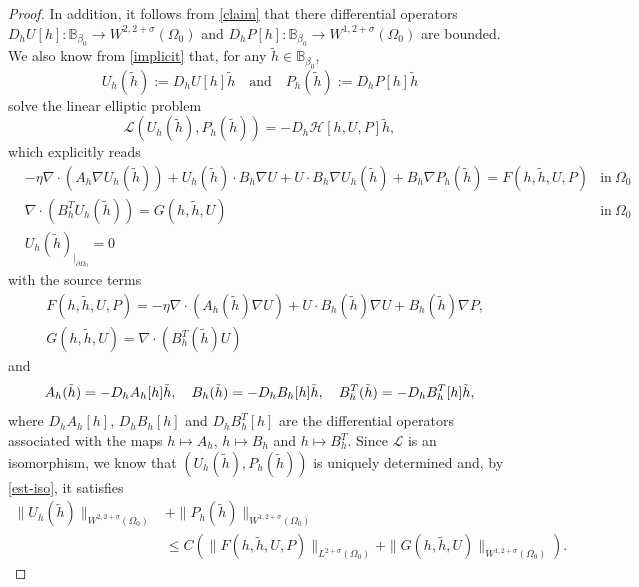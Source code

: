 \documentclass[10pt,a4paper]{amsart}
\begin{document}
\begin{proof}
In addition, it follows from \eqref{claim} that there differential operators $D_h U[h] : \mathbb{B}_{\beta_0}\rightarrow W^{2, 2+\sigma}(\Omega_0)$ and $D_h P[h] : \mathbb{B}_{\beta_0}\rightarrow W^{1,2+\sigma}(\Omega_0)$ are bounded. We also know from \eqref{implicit} that, for any $\tilde h\in \mathbb{B}_{\beta_0}$,  $$U_h(\tilde{h}):=D_h U[h] \tilde{h}\quad \text{and} \quad P_h(\tilde{h}):=D_h P[h] \tilde{h}$$ solve the linear elliptic problem
\begin{equation*}
\mathcal{L}( U_h(\tilde{h}), P_h(\tilde{h}) )= - D_h\mathcal{H}[h, U, P]\tilde{h},
\end{equation*} which explicitly reads
\begin{equation*}
\begin{aligned}
&-\eta\nabla \cdot (A_h\nabla U_h(\tilde{h})) + U_h(\tilde{h}) \cdot B_h\nabla U + U \cdot B_h\nabla U_h(\tilde{h}) + B_h\nabla P_h(\tilde{h})= F(h, \tilde{h}, U, P)
&\mbox{in} \ \Omega_0 \\[5pt]
&\nabla \cdot (B_h^T U_h(\tilde{h})) = G(h, \tilde{h}, U) &\mbox{in} \ \Omega_0\\[5pt]
&U_h(\tilde{h})_{|_{\partial \Omega_0}}=0
\end{aligned}
\end{equation*}
with the source terms
\begin{equation*}\begin{aligned}
    &F(h, \tilde{h}, U, P)=-\eta \nabla \cdot (A_h(\tilde{h})\nabla U) + U\cdot B_h(\tilde{h})\nabla U + B_h(\tilde{h})\nabla P,\\[5pt]&
    G(h, \tilde{h}, U)= \nabla \cdot ( B^T_h(\tilde{h}) U)
    \end{aligned}
\end{equation*}
and
\begin{equation*}
A_h(\tilde{h})=- D_h A_h[h]\tilde{h}, \quad
B_h(\tilde{h})= -D_h B_h[h]\tilde{h},\quad
B_h^T(\tilde{h})= -D_h B_h^T[h]\tilde{h}, \\[5pt]
\end{equation*} where $D_h A_h[h]$, $ D_h B_h[h]$ and $D_h B_h^T[h]$ are the differential operators associated with the maps $h\mapsto A_h$, $h\mapsto B_h$ and $h\mapsto B_h^T$.
Since $\mathcal{L}$ is an isomorphism, we know that $(U_h(\tilde{h}), P_h(\tilde{h}))$ is uniquely determined and, by \eqref{est-iso}, it satisfies
\begin{equation}\label{est-appdiff}\begin{aligned}
    \|U_h(\tilde{h})\|_{W^{2, 2+\sigma}(\Omega_0)} &+ \|P_h(\tilde{h})\|_{W^{1, 2+\sigma}(\Omega_0)} \\[5pt]&\leq C \left( \|F(h, \tilde{h}, U, P)\|_{L^{2+\sigma}(\Omega_0)} + \|G(h, \tilde{h}, U)\|_{W^{1, 2+\sigma}(\Omega_0)} \right).\end{aligned}

\end{equation}
\end{proof}
\end{document}
